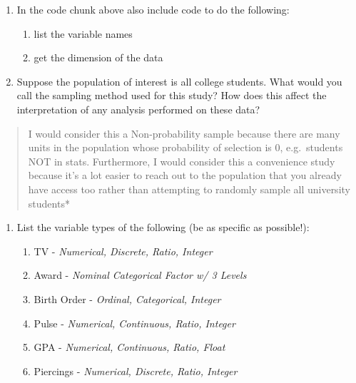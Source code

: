\documentclass[]{article}
\providecommand{\tightlist}{%
  \setlength{\itemsep}{0pt}\setlength{\parskip}{0pt}}
\begin{document}
\begin{enumerate}
\def\labelenumi{\alph{enumi})}
\setcounter{enumi}{1}
\item
  In the code chunk above also include code to do the following:

  \begin{enumerate}
  \def\labelenumii{\roman{enumii}.}
  \tightlist
  \item
    list the variable names
  \item
    get the dimension of the data
  \end{enumerate}
\item
  Suppose the population of interest is all college students. What would
  you call the sampling method used for this study? How does this affect
  the interpretation of any analysis performed on these data?
\end{enumerate}

\begin{quote}
I would consider this a Non-probability sample because there are many
units in the population whose probability of selection is 0,
e.g.~students NOT in stats. Furthermore, I would consider this a
convenience study because it's a lot easier to reach out to the
population that you already have access too rather than attempting to
randomly sample all university students*
\end{quote}

\begin{enumerate}
\def\labelenumi{\alph{enumi})}
\setcounter{enumi}{3}
\item
  List the variable types of the following (be as specific as
  possible!):

  \begin{enumerate}
  \def\labelenumii{\arabic{enumii}.}
  \item
    TV - \emph{Numerical, Discrete, Ratio, Integer}
  \item
    Award - \emph{Nominal Categorical Factor w/ 3 Levels}
  \item
    Birth Order - \emph{Ordinal, Categorical, Integer}
  \item
    Pulse - \emph{Numerical, Continuous, Ratio, Integer}
  \item
    GPA - \emph{Numerical, Continuous, Ratio, Float}
  \item
    Piercings - \emph{Numerical, Discrete, Ratio, Integer}
  \end{enumerate}
\end{enumerate}
\end{document}
